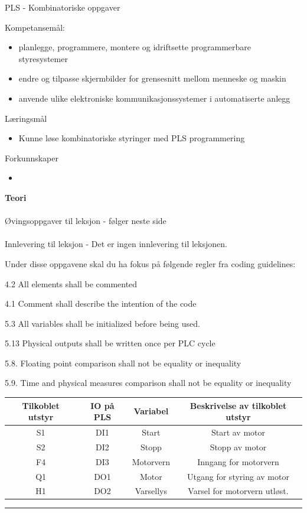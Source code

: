 \documentclass[12pt,a4paper]{article}
\begin{document}
\centerline{PLS - Kombinatoriske oppgaver}  \bigskip

Kompetansemål:
\begin{itemize}[noitemsep]

	\item planlegge, programmere, montere og idriftsette programmerbare styresystemer
	\item endre og tilpasse skjermbilder for grensesnitt mellom menneske og maskin
	\item anvende ulike elektroniske kommunikasjonssystemer i automatiserte anlegg
\end{itemize}
	Læringsmål
	\begin{itemize}[noitemsep]
		\item Kunne løse kombinatoriske styringer med PLS programmering
	\end{itemize}

	Forkunnskaper

	\begin{itemize}[noitemsep]
		\item 

	\end{itemize}
\textbf{Teori}\\\\
Øvingsoppgaver til leksjon - følger neste side\\\\
Innlevering til leksjon - Det er ingen innlevering til leksjonen. 


Under disse oppgavene skal du ha fokus på følgende regler fra coding
guidelines:

4.2 All elements shall be commented

4.1 Comment shall describe the intention of the code

5.3 All variables shall be initialized before being used. 

5.13 Physical outputs shall be written once per PLC cycle

5.8. Floating point comparison shall not be equality or inequality

5.9. Time and physical measures comparison shall not be equality or
inequality

\begin{tabular}{|c|c|c|c|}
\hline 
Tilkoblet utstyr & IO på PLS & Variabel & Beskrivelse av tilkoblet utstyr\tabularnewline
\hline 
\hline 
S1 & DI1 & Start & Start av motor\tabularnewline
\hline 
S2 & DI2 & Stopp & Stopp av motor\tabularnewline
\hline 
F4 & DI3 & Motorvern & Inngang for motorvern\tabularnewline
\hline 
Q1 & DO1 & Motor & Utgang for styring av motor\tabularnewline
\hline 
H1 & DO2 & Varsellys & Varsel for motorvern utløst. \tabularnewline
\hline 
\end{tabular}
\bigskip 
\hrule
\vfil \eject
\end{document}
